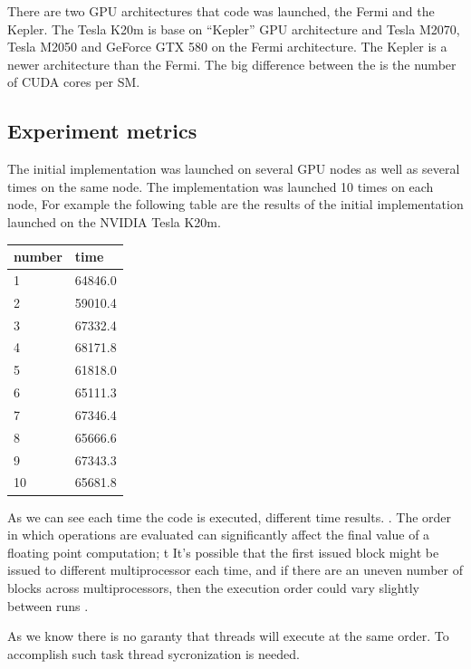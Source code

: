 There are two GPU architectures that code was launched, the Fermi and the Kepler. The Tesla K20m is base on ``Kepler'' GPU architecture and Tesla M2070, Tesla M2050 and GeForce GTX 580 on the Fermi architecture. The Kepler is a newer architecture than the Fermi. The big difference between the is the number of CUDA cores per SM.


\subsection{Experiment metrics}

The initial implementation was launched on several GPU nodes as well as several times on the same node. The implementation was launched 10 times on each node, For example the following table are the results of the initial implementation launched on the NVIDIA Tesla K20m.

\begin{table}[h]
\centering
  \begin{tabular} { |  l  |  l  |  }
    \hline
    number & time  \\
    \hline
    1 &  64846.0 \\
   \hline
    2 & 59010.4 \\
   \hline
    3 & 67332.4\\
   \hline
    4 & 68171.8 \\
   \hline
    5 & 61818.0 \\
   \hline
    6 & 65111.3\\
    \hline
    7 &  67346.4\\
    \hline
    8 & 65666.6 \\
    \hline
    9 & 67343.3 \\
    \hline
    10 & 65681.8      \\
   \hline
  \end{tabular}
  \end{table}
  
As we can see each time the code is executed, different time results.  . The order in which operations are evaluated can significantly affect the final value of a floating point computation; t
It's possible that the first issued block might be issued to different multiprocessor each time, and if there are an uneven number of blocks across multiprocessors, then the execution order could vary slightly between runs \cite{cook}.

As we know there is no garanty that threads will execute at the same order. To accomplish such task thread sycronization is needed.



